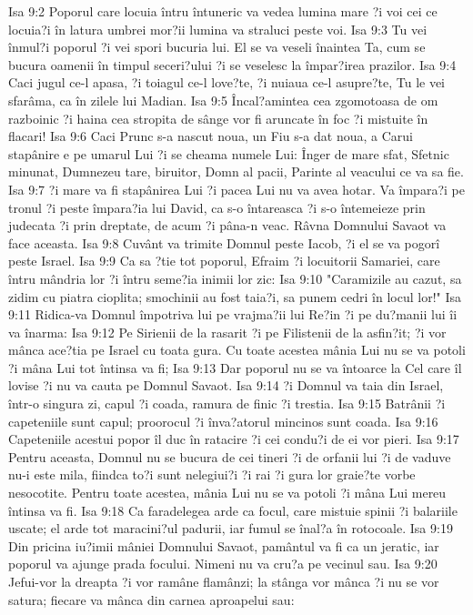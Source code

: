 Isa 9:2  Poporul care locuia întru întuneric va vedea lumina mare ?i voi cei ce locuia?i în latura umbrei mor?ii lumina va straluci peste voi.
Isa 9:3  Tu vei înmul?i poporul ?i vei spori bucuria lui. El se va veseli înaintea Ta, cum se bucura oamenii în timpul seceri?ului ?i se veselesc la împar?irea prazilor.
Isa 9:4  Caci jugul ce-l apasa, ?i toiagul ce-l love?te, ?i nuiaua ce-l asupre?te, Tu le vei sfarâma, ca în zilele lui Madian.
Isa 9:5  Încal?amintea cea zgomotoasa de om razboinic ?i haina cea stropita de sânge vor fi aruncate în foc ?i mistuite în flacari!
Isa 9:6  Caci Prunc s-a nascut noua, un Fiu s-a dat noua, a Carui stapânire e pe umarul Lui ?i se cheama numele Lui: Înger de mare sfat, Sfetnic minunat, Dumnezeu tare, biruitor, Domn al pacii, Parinte al veacului ce va sa fie.
Isa 9:7  ?i mare va fi stapânirea Lui ?i pacea Lui nu va avea hotar. Va împara?i pe tronul ?i peste împara?ia lui David, ca s-o întareasca ?i s-o întemeieze prin judecata ?i prin dreptate, de acum ?i pâna-n veac. Râvna Domnului Savaot va face aceasta.
Isa 9:8  Cuvânt va trimite Domnul peste Iacob, ?i el se va pogorî peste Israel.
Isa 9:9  Ca sa ?tie tot poporul, Efraim ?i locuitorii Samariei, care întru mândria lor ?i întru seme?ia inimii lor zic:
Isa 9:10  "Caramizile au cazut, sa zidim cu piatra cioplita; smochinii au fost taia?i, sa punem cedri în locul lor!"
Isa 9:11  Ridica-va Domnul împotriva lui pe vrajma?ii lui Re?in ?i pe du?manii lui îi va înarma:
Isa 9:12  Pe Sirienii de la rasarit ?i pe Filistenii de la asfin?it; ?i vor mânca ace?tia pe Israel cu toata gura. Cu toate acestea mânia Lui nu se va potoli ?i mâna Lui tot întinsa va fi;
Isa 9:13  Dar poporul nu se va întoarce la Cel care îl lovise ?i nu va cauta pe Domnul Savaot.
Isa 9:14  ?i Domnul va taia din Israel, într-o singura zi, capul ?i coada, ramura de finic ?i trestia.
Isa 9:15  Batrânii ?i capeteniile sunt capul; proorocul ?i înva?atorul mincinos sunt coada.
Isa 9:16  Capeteniile acestui popor îl duc în ratacire ?i cei condu?i de ei vor pieri.
Isa 9:17  Pentru aceasta, Domnul nu se bucura de cei tineri ?i de orfanii lui ?i de vaduve nu-i este mila, fiindca to?i sunt nelegiui?i ?i rai ?i gura lor graie?te vorbe nesocotite. Pentru toate acestea, mânia Lui nu se va potoli ?i mâna Lui mereu întinsa va fi.
Isa 9:18  Ca faradelegea arde ca focul, care mistuie spinii ?i balariile uscate; el arde tot maracini?ul padurii, iar fumul se înal?a în rotocoale.
Isa 9:19  Din pricina iu?imii mâniei Domnului Savaot, pamântul va fi ca un jeratic, iar poporul va ajunge prada focului. Nimeni nu va cru?a pe vecinul sau.
Isa 9:20  Jefui-vor la dreapta ?i vor ramâne flamânzi; la stânga vor mânca ?i nu se vor satura; fiecare va mânca din carnea aproapelui sau:
